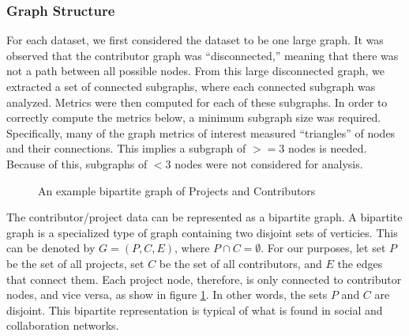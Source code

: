 \documentclass{proc}
\begin{document}
\subsubsection{Graph Structure}
For each dataset, we first considered the dataset to be one large graph. It was observed that the contributor graph was ``disconnected,'' meaning that there was not a path between all possible nodes. From this large disconnected graph, we extracted a set of connected subgraphs, where each connected subgraph was analyzed. Metrics were then computed for each of these subgraphs. In order to correctly compute the metrics below, a minimum subgraph size was required. Specifically, many of the graph metrics of interest measured ``triangles'' of nodes and their connections. This implies a subgraph of {$>= 3$} nodes is needed. Because of this, subgraphs of {$< 3$} nodes were not considered for analysis.

\begin{figure}
\centering
{}
\caption{An example bipartite graph of Projects and Contributors}
\label{fig:example_bipartite_graph}
\end{figure}

The contributor/project data can be represented as a bipartite graph. A bipartite graph is a specialized type of graph containing two disjoint sets of verticies. This can be denoted by ${G=(P,C,E)}$, where ${P \cap C = \emptyset}$. For our purposes, let set $P$ be the set of all projects, set $C$ be the set of all contributors, and $E$ the edges that connect them. Each project node, therefore, is only connected to contributor nodes, and vice versa, as show in figure \ref{fig:example_bipartite_graph}. In other words, the sets $P$ and $C$ are disjoint. This bipartite representation is typical of what is found in social and collaboration networks\cite{ramasco2004self}.  
\end{document}
